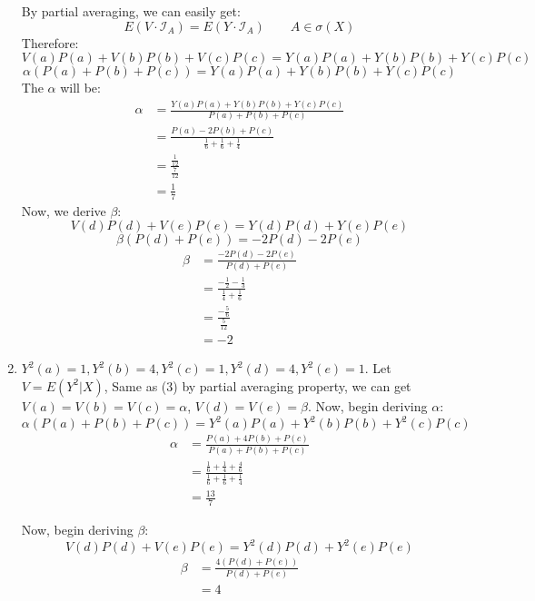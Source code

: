 \documentclass[11pt]{article} %
\begin{document}
\begin{enumerate}[(1)]
    By partial averaging, we can easily get:
     \begin{equation*}
        E(V\cdot \mathcal{I}_A) = E(Y \cdot \mathcal{I}_A) \quad \quad A\in \sigma(X)
     \end{equation*}
    Therefore:
    \begin{equation*}
        V(a)P(a)+V(b)P(b)+V(c)P(c) = Y(a)P(a)+Y(b)P(b)+Y(c)P(c)
    \end{equation*}
    \begin{equation*}
        \alpha(P(a)+P(b)+P(c)) = Y(a)P(a)+Y(b)P(b)+Y(c)P(c)
    \end{equation*}
    The $\alpha$ will be:
    \begin{align*}
        \alpha &= \frac{Y(a)P(a)+Y(b)P(b)+Y(c)P(c)}{P(a)+P(b)+P(c)}\\
                &= \frac{P(a)-2P(b)+P(c)}{\frac{1}{6}+\frac{1}{6}+\frac{1}{4}}\\
                &= \frac{\frac{1}{12}}{\frac{7}{12}}\\
                &= \frac{1}{7}
    \end{align*}
    Now, we derive $\beta$:
    \begin{equation*}
        V(d)P(d)+V(e)P(e)=Y(d)P(d)+Y(e)P(e)
    \end{equation*}
    \begin{equation*}
        \beta(P(d)+P(e))= -2P(d)-2P(e)
    \end{equation*}
    \begin{align*}
        \beta &= \frac{-2P(d)-2P(e)}{P(d)+P(e)}\\
            &= \frac{-\frac{1}{2}-\frac{1}{3}}{\frac{1}{4}+\frac{1}{6}}\\
            &=\frac{-\frac{5}{6}}{\frac{5}{12}}\\
            &=-2
    \end{align*}

\item $Y^2(a)=1, Y^2(b)= 4, Y^2(c)=1, Y^2(d)=4, Y^2(e)=1$. Let $V=E(Y^2|X)$, Same as (3) by partial averaging property, we can get
    $V(a)=V(b)=V(c)=\alpha$, $V(d)=V(e)=\beta$.
    Now, begin deriving $\alpha$:
        \begin{equation*}
            \alpha(P(a)+P(b)+P(c)) = Y^2(a)P(a)+Y^2(b)P(b)+Y^2(c)P(c)
        \end{equation*}
        \begin{align*}
            \alpha &= \frac{P(a)+4P(b)+P(c)}{P(a)+P(b)+P(c)}\\
                    &= \frac{\frac{1}{6}+\frac{1}{4}+\frac{4}{6}}{\frac{1}{6}+\frac{1}{6}+\frac{1}{4}}\\
                    &=\frac{13}{7}
        \end{align*}

    Now, begin deriving $\beta$:
    \begin{equation*}
        V(d)P(d)+V(e)P(e)=Y^2(d)P(d)+Y^2(e)P(e)
    \end{equation*}
    \begin{align*}
        \beta &= \frac{4(P(d)+P(e))}{P(d)+P(e)}\\
            &= 4
    \end{align*}
\end{enumerate}
\end{document}

